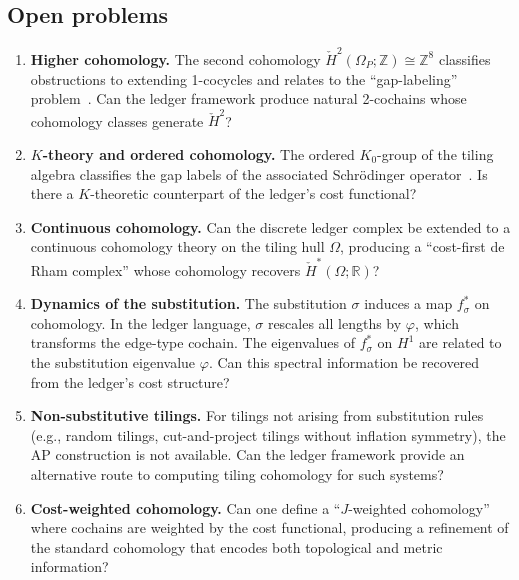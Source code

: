 \documentclass[12pt]{article}
\theoremstyle{definition}
\theoremstyle{remark}
\newcommand{\RR}{\mathbb{R}}
\newcommand{\ZZ}{\mathbb{Z}}
\newcommand{\Hcech}{\check{H}}
\begin{document}
\subsection{Open problems}

\begin{enumerate}
\item \textbf{Higher cohomology.} The second cohomology $\Hcech^2(\Omega_P; \ZZ) \cong \ZZ^8$ classifies obstructions to extending 1-cocycles and relates to the ``gap-labeling'' problem~\cite{BellissardBenedettGambaudi2006}. Can the ledger framework produce natural 2-cochains whose cohomology classes generate $\Hcech^2$?

\item \textbf{$K$-theory and ordered cohomology.} The ordered $K_0$-group of the tiling algebra classifies the gap labels of the associated Schr\"{o}dinger operator~\cite{BellissardBenedettGambaudi2006}. Is there a $K$-theoretic counterpart of the ledger's cost functional?

\item \textbf{Continuous cohomology.} Can the discrete ledger complex be extended to a continuous cohomology theory on the tiling hull $\Omega$, producing a ``cost-first de Rham complex'' whose cohomology recovers $\Hcech^*(\Omega; \RR)$?

\item \textbf{Dynamics of the substitution.} The substitution $\sigma$ induces a map $f_\sigma^*$ on cohomology. In the ledger language, $\sigma$ rescales all lengths by $\varphi$, which transforms the edge-type cochain. The eigenvalues of $f_\sigma^*$ on $H^1$ are related to the substitution eigenvalue $\varphi$. Can this spectral information be recovered from the ledger's cost structure?

\item \textbf{Non-substitutive tilings.} For tilings not arising from substitution rules (e.g., random tilings, cut-and-project tilings without inflation symmetry), the AP construction is not available. Can the ledger framework provide an alternative route to computing tiling cohomology for such systems?

\item \textbf{Cost-weighted cohomology.} Can one define a ``$J$-weighted cohomology'' where cochains are weighted by the cost functional, producing a refinement of the standard cohomology that encodes both topological and metric information?
\end{enumerate}
\end{document}
